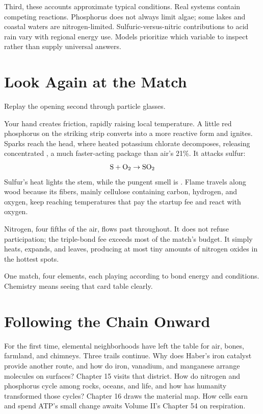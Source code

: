 Third, these accounts approximate typical conditions. Real systems contain competing reactions. Phosphorus does not always limit algae; some lakes and coastal waters are nitrogen-limited. Sulfuric-versus-nitric contributions to acid rain vary with regional energy use. Models prioritize which variable to inspect rather than supply universal answers.

\section{Look Again at the Match}

Replay the opening second through particle glasses.

Your hand creates friction, rapidly raising local temperature. A little red phosphorus on the striking strip converts into a more reactive form and ignites. Sparks reach the head, where heated potassium chlorate decomposes, releasing concentrated , a much faster-acting package than air's 21\%. It attacks sulfur:
\[\mathrm{S} + \mathrm{O_2} \rightarrow \mathrm{SO_2}\]
Sulfur's heat lights the stem, while the pungent smell is . Flame travels along wood because its fibers, mainly cellulose containing carbon, hydrogen, and oxygen, keep reaching temperatures that pay the startup fee and react with oxygen.

Nitrogen, four fifths of the air, flows past throughout. It does not refuse participation; the triple-bond fee exceeds most of the match's budget. It simply heats, expands, and leaves, producing at most tiny amounts of nitrogen oxides in the hottest spots.

One match, four elements, each playing according to bond energy and conditions. Chemistry means seeing that card table clearly.

\section{Following the Chain Onward}

For the first time, elemental neighborhoods have left the table for air, bones, farmland, and chimneys. Three trails continue. Why does Haber's iron catalyst provide another route, and how do iron, vanadium, and manganese arrange molecules on surfaces? Chapter 15 visits that district. How do nitrogen and phosphorus cycle among rocks, oceans, and life, and how has humanity transformed those cycles? Chapter 16 draws the material map. How cells earn and spend ATP's small change awaits Volume II's Chapter 54 on respiration.

